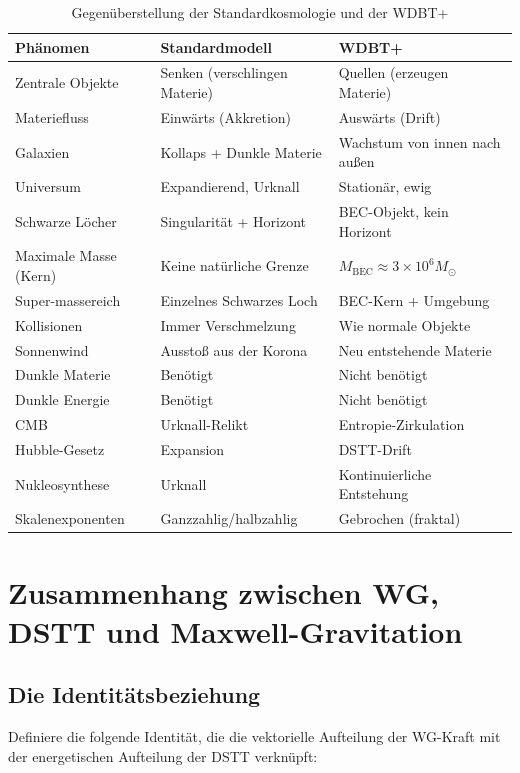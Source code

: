 \documentclass[12pt,a4paper]{article}
\begin{document}
\begin{table}[ht]
\centering
\caption{Gegenüberstellung der Standardkosmologie und der WDBT+}
\begin{tabular}{p{4cm}p{4.5cm}p{4.5cm}}
\toprule
Phänomen & Standardmodell & WDBT+ \\
\midrule
Zentrale Objekte & Senken (verschlingen Materie) & Quellen (erzeugen Materie) \\
Materiefluss & Einwärts (Akkretion) & Auswärts (Drift) \\
Galaxien & Kollaps + Dunkle Materie & Wachstum von innen nach außen \\
Universum & Expandierend, Urknall & Stationär, ewig \\
Schwarze Löcher & Singularität + Horizont & BEC-Objekt, kein Horizont \\
Maximale Masse (Kern) & Keine natürliche Grenze & $M_{\text{BEC}} \approx 3\times 10^6 M_{\odot}$ \\
Super-massereich & Einzelnes Schwarzes Loch & BEC-Kern + Umgebung \\
Kollisionen & Immer Verschmelzung & Wie normale Objekte \\
Sonnenwind & Ausstoß aus der Korona & Neu entstehende Materie \\
Dunkle Materie & Benötigt & Nicht benötigt \\
Dunkle Energie & Benötigt & Nicht benötigt \\
CMB & Urknall-Relikt & Entropie-Zirkulation \\
Hubble-Gesetz & Expansion & DSTT-Drift \\
Nukleosynthese & Urknall & Kontinuierliche Entstehung \\
Skalenexponenten & Ganzzahlig/halbzahlig & Gebrochen (fraktal) \\
\bottomrule
\end{tabular}
\end{table}

\section{Zusammenhang zwischen WG, DSTT und Maxwell-Gravitation}

\subsection{Die Identitätsbeziehung}

Definiere die folgende Identität, die die vektorielle Aufteilung der WG-Kraft mit der energetischen Aufteilung der DSTT verknüpft:
\end{document}
